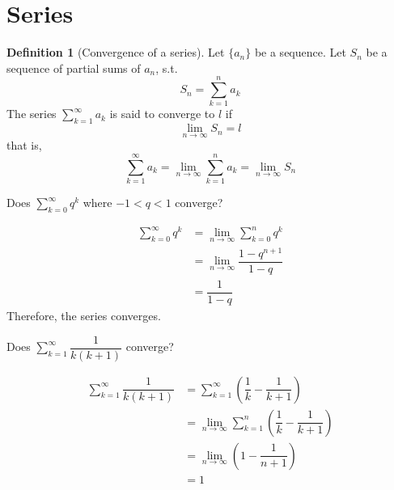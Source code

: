 \documentclass[fleqn, a4paper, 12pt, twoside]{article}
\theoremstyle{definition}
\newtheorem{definition}{Definition}
\theoremstyle{theorem}
\begin{document}
\section{Series}

\begin{definition}[Convergence of a series]
	Let $\{a_n\}$ be a sequence. Let $S_n$ be a sequence of partial sums of $a_n$, s.t.
	\begin{equation*}
		S_n = \sum_{k = 1}^{n} a_k
	\end{equation*}
	The series $\sum_{k = 1}^{\infty} a_k$ is said to converge to $l$ if
	\begin{equation*}
		\lim\limits_{n \to \infty} S_n = l
	\end{equation*}
	that is,
	\begin{equation*}
		\sum_{k = 1}^{\infty} a_k = \lim\limits_{n \to \infty} \sum_{k = 1}^{n} a_k = \lim\limits_{n \to \infty} S_n
	\end{equation*}
\end{definition}

\begin{question}
	Does $\displaystyle \sum_{k = 0}^{\infty} q^k$ where $-1 < q < 1$ converge?
\end{question}

\begin{solution}
	\begin{align*}
		\sum_{k = 0}^{\infty} q^k &= \lim\limits_{n \to \infty} \sum_{k = 0}^{n} q^k\\
		&= \lim\limits_{n \to \infty} \dfrac{1 - q^{n + 1}}{1 - q}\\
		&= \dfrac{1}{1 - q}
	\end{align*}
	Therefore, the series converges.
\end{solution}

\begin{question}
	Does $\displaystyle \sum_{k = 1}^{\infty} \dfrac{1}{k(k + 1)}$ converge?
\end{question}

\begin{solution}
	\begin{align*}
		\sum_{k = 1}^{\infty} \dfrac{1}{k(k + 1)} &= \sum_{k = 1}^{\infty} \left( \dfrac{1}{k} - \dfrac{1}{k + 1} \right)\\
		&= \lim\limits_{n \to \infty} \sum_{k = 1}^{n} \left( \dfrac{1}{k} - \dfrac{1}{k + 1} \right)\\
		&= \lim\limits_{n \to \infty} \left( 1 - \dfrac{1}{n + 1} \right)\\
		&= 1
	\end{align*}
\end{solution}
\end{document}
